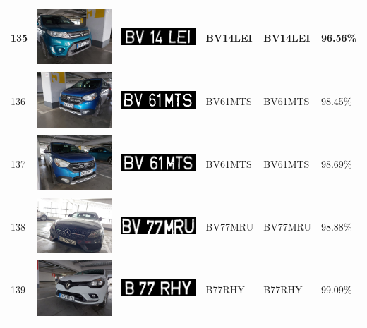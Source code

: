 \documentclass[a4paper,12pt]{report}
\begin{document}
\begin{longtable}{| m{0.6cm} | m{3cm} | m{3cm} | m{1.8cm} | m{1.8cm} | m{1.8cm} |}
        135 & \includegraphics[width=3cm,keepaspectratio]{dataset/79_s1.jpg} & \includegraphics[width=3cm,keepaspectratio]{segmentari/135.jpg} & BV14LEI & BV14LEI & 96.56\% \\ \hline
        136 & \includegraphics[width=3cm,keepaspectratio]{dataset/80_d1.jpg} & \includegraphics[width=3cm,keepaspectratio]{segmentari/136.jpg} & BV61MTS & BV61MTS & 98.45\% \\ \hline
        137 & \includegraphics[width=3cm,keepaspectratio]{dataset/80_s1.jpg} & \includegraphics[width=3cm,keepaspectratio]{segmentari/137.jpg} & BV61MTS & BV61MTS & 98.69\% \\ \hline
        138 & \includegraphics[width=3cm,keepaspectratio]{dataset/81_d1.jpg} & \includegraphics[width=3cm,keepaspectratio]{segmentari/138.jpg} & BV77MRU & BV77MRU & 98.88\% \\ \hline
        139 & \includegraphics[width=3cm,keepaspectratio]{dataset/82_d1.jpg} & \includegraphics[width=3cm,keepaspectratio]{segmentari/139.jpg} & B77RHY & B77RHY & 99.09\% \\ \hline

\end{longtable}
\end{document}

